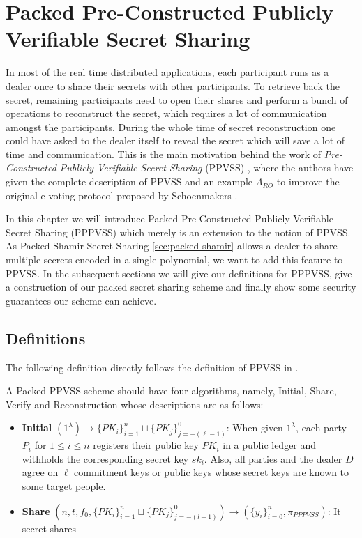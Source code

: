 \chapter{Packed Pre-Constructed Publicly Verifiable Secret Sharing}
\label{cha:2}
In most of the real time distributed applications, each participant runs as a dealer once to share their 
secrets with other participants. To retrieve back the secret, remaining participants need to open their 
shares and perform a bunch of operations to reconstruct the secret, which requires a lot of communication 
amongst the participants. During the whole time of secret reconstruction one could have asked to the dealer 
itself to reveal the secret which will save a lot of time and communication. This is the main motivation 
behind the work of \textit{Pre-Constructed Publicly Verifiable Secret Sharing} (PPVSS) \cite{cryptoeprint:2025/576}, 
where the authors have given the complete description of PPVSS and an example $\Lambda_{RO}$ to improve 
the original e-voting protocol proposed by Schoenmakers \cite{5581ccd9530540479539d21d1d39ae96}.\par

In this chapter we will introduce Packed Pre-Constructed Publicly Verifiable Secret Sharing (PPPVSS) which merely 
is an extension to the notion of PPVSS. As Packed Shamir Secret Sharing \ref{sec:packed-shamir} allows a 
dealer to share multiple secrets encoded in a single polynomial, we want to add this feature to PPVSS. In the 
subsequent sections we will give our definitions for PPPVSS, give a construction of our packed secret sharing 
scheme and finally show some security guarantees our scheme can achieve.\par

\section{Definitions}
\label{sec:pppvss-definitions}

The following definition directly follows the definition of PPVSS in \cite{cryptoeprint:2025/576}.

\begin{definition}
    A Packed PPVSS scheme should have four algorithms, namely, Initial, Share, Verify and Reconstruction whose 
    descriptions are as follows:
    \begin{itemize}
        \item \textbf{Initial} $(1^\lambda)\rightarrow\{PK_i\}_{i=1}^n\sqcup\{PK_j\}_{j=-(\ell-1)}^0$: 
          When given $1^\lambda$, each party $P_i$ for $1\leq i\leq n$ registers their public key $PK_i$ in a 
          public ledger and withholds the corresponding secret key $sk_i$. Also, all parties and the dealer $D$ 
          agree on $\ell$ commitment keys or public keys whose secret keys are known to some target people.
        \item \textbf{Share} $(n,t,f_0,\{PK_i\}_{i=1}^n\sqcup\{PK_j\}_{j=-(l-1)}^0)\rightarrow(\{y_i\}_{i=0}^n,\pi_{PPPVSS})$: 
          It secret shares 
    \end{itemize}
\end{definition}


